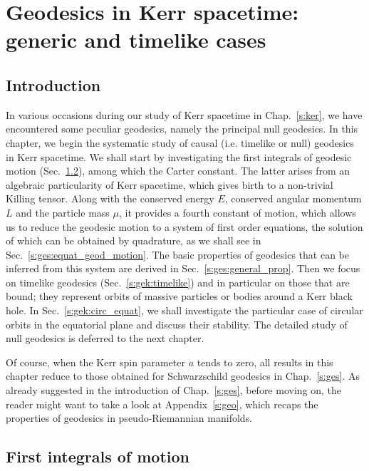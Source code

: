 \chapter{Geodesics in Kerr spacetime: generic and timelike cases}
\label{s:gek}

\minitoc

\section{Introduction}

In various occasions during our study of Kerr spacetime in Chap.~\ref{s:ker}, we have
encountered some peculiar geodesics, namely
the principal null geodesics. In this chapter, we begin the systematic study of causal
(i.e. timelike or null) geodesics in Kerr spacetime.
We shall start by investigating the first integrals of geodesic motion
(Sec.~\ref{s:gek:integrals_motion}), among which the Carter constant.
The latter arises from an algebraic particularity of Kerr spacetime, which gives
birth to a non-trivial Killing tensor. Along with the conserved energy $E$, conserved angular
momentum $L$ and the particle mass $\mu$, it provides a fourth constant of motion,
which allows us to reduce the geodesic motion to a system of first order equations,
the solution of which can be obtained by quadrature, as we shall see
in Sec.~\ref{s:ges:equat_geod_motion}.
The basic properties of geodesics that can be inferred from this system are derived
in Sec.~\ref{s:ges:general_prop}.
Then we focus on timelike geodesics (Sec.~\ref{s:gek:timelike}) and in particular
on those that are bound; they represent orbits of massive particles or bodies around a
Kerr black hole. In Sec.~\ref{s:gek:circ_equat}, we shall investigate the particular
case of circular orbits in the equatorial plane and discuss their stability.
The detailed study of null geodesics is deferred to the next chapter.

Of course, when the Kerr spin parameter $a$ tends to zero, all
results in this chapter reduce to those obtained for Schwarzschild geodesics
in Chap.~\ref{s:ges}. As already suggested in the introduction of Chap.~\ref{s:ges}, before moving on, the reader might want to take
a look at Appendix~\ref{s:geo}, which recaps the properties of geodesics in
pseudo-Riemannian manifolds.


\section{First integrals of motion} \label{s:gek:integrals_motion}

